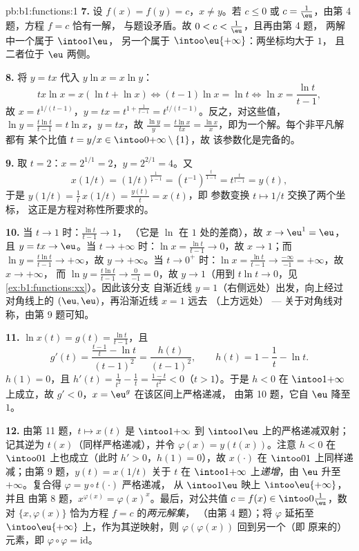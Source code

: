 \begin{solution}{pb:b1:functions:1}
\textbf{7.} 设 $f(x) = f(y) = c$，$x \neq y$。若 $c \leq 0$ 或
$c = \frac1\eu$，由第 4 题，方程 $f = c$ 恰有一解，
与题设矛盾。故 $0 < c < \frac1\eu$，且再由第 4 题，
两解中一个属于 $\intoo1\eu$，
另一个属于 $\intoo\eu{+\infty}$：两坐标均大于 $1$，
且二者位于 $\eu$ 两侧。

\textbf{8.} 将 $y = tx$ 代入 $y\ln x = x\ln y$：
\[
tx\ln x = x(\ln t + \ln x)
\iff (t - 1)\ln x = \ln t
\iff \ln x = \frac{\ln t}{t - 1} ,
\]
故 $x = t^{1/(t-1)}$，$y = tx = t^{1 + \frac1{t-1}} =
t^{t/(t-1)}$。反之，对这些值，$\ln y = \frac{t\ln
t}{t-1} = t\ln x$，$y = tx$，故 $\frac{\ln y}y = \frac{t\ln
x}{tx} = \frac{\ln x}x$，即为一个解。每个非平凡解都有
某个比值 $t = y/x \in \intoo0{+\infty} \setminus \{1\}$，故
该参数化是完备的。

\textbf{9.} 取 $t = 2$：$x = 2^{1/1} = 2$，$y = 2^{2/1} = 4$。又
\[
x(1/t) = (1/t)^{\frac1{\frac1t - 1}}
= (t^{-1})^{\frac{t}{1 - t}}
= t^{\frac{t}{t - 1}} = y(t) ,
\]
于是 $y(1/t) = \frac1t\,x(1/t) = \frac{y(t)}t = x(t)$，即
参数变换 $t \mapsto 1/t$ 交换了两个坐标，
这正是方程对称性所要求的。

\textbf{10.} 当 $t \to 1$ 时：$\frac{\ln t}{t-1} \to 1$，
（它是 $\ln$ 在 $1$ 处的差商），故 $x \to \eu^1 = \eu$，且
$y = tx \to \eu$。当 $t \to +\infty$ 时：$\ln x = \frac{\ln t}{t-1}
\to 0$，故 $x \to 1$；而 $\ln y = \frac{t\ln t}{t-1} \to
+\infty$，故 $y \to +\infty$。当 $t \to 0^+$ 时：$\ln x = \frac{\ln
t}{t-1} \to \frac{-\infty}{-1} = +\infty$，故 $x \to +\infty$，
而 $\ln y = \frac{t\ln t}{t-1} \to \frac{0}{-1} = 0$，故 $y \to
1$（用到 $t\ln t \to 0$，见\cref{ex:b1:functions:xx}）。因此该分支
自渐近线 $y = 1$（右侧远处）出发，向上经过
对角线上的 $(\eu, \eu)$，再沿渐近线 $x = 1$ 远去
（上方远处） --- 关于对角线对称，由第 9 题可知。

\textbf{11.} $\ln x(t) = g(t) = \frac{\ln t}{t-1}$，且
\[
g'(t) = \frac{\frac{t-1}t - \ln t}{(t-1)^2}
= \frac{h(t)}{(t-1)^2},
\qquad h(t) = 1 - \frac1t - \ln t .
\]
$h(1) = 0$，且 $h'(t) = \frac1{t^2} - \frac1t = \frac{1 -
t}{t^2} < 0$（$t > 1$）。于是 $h < 0$ 在 $\intoo1{+\infty}$ 上成立，故 $g' <
0$，$x = \eu^g$ 在该区间上严格递减，
由第 10 题，它自 $\eu$ 降至 $1$。

\textbf{12.} 由第 11 题，$t \mapsto x(t)$ 是
$\intoo1{+\infty}$ 到 $\intoo1\eu$ 上的严格递减双射；
记其逆为 $t(x)$（同样严格递减），并令
$\varphi(x) = y(t(x))$。注意 $h < 0$ 在 $\intoo01$ 上也成立（此时
$h' > 0$，$h(1) = 0$），故 $x(\cdot)$ 在
$\intoo01$ 上同样递减；由第 9 题，$y(t) = x(1/t)$ 关于 $t$ 在
$\intoo1{+\infty}$ 上\emph{递增}，由 $\eu$ 升至
$+\infty$。复合得 $\varphi = y \circ t(\cdot)$ 严格递减，
从 $\intoo1\eu$ 映上 $\intoo\eu{+\infty}$，并且
由第 8 题，$x^{\varphi(x)} = \varphi(x)^x$。最后，对公共值
$c = f(x) \in \intoo0{\frac1\eu}$，数对 $\{x,
\varphi(x)\}$ 恰为方程 $f = c$ 的\emph{两元解集}，
（由第 4 题）；将 $\varphi$ 延拓至 $\intoo\eu{+\infty}$ 上，作为其逆映射，则
$\varphi(\varphi(x))$ 回到另一个（即
原来的）元素，即 $\varphi \circ \varphi = \mathrm{id}$。


\end{solution}
